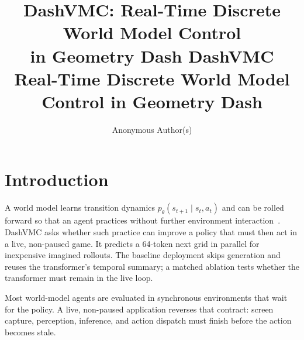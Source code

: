 \ifdashvmcsubmission
  \title{DashVMC: Real-Time Discrete World Model Control\\in Geometry Dash}
  \author{Anonymous Author(s)}
\else
  \title{%
    DashVMC\\[0.1em]
    {\large\color{black!70}Real-Time Discrete World Model Control in Geometry Dash}%
  }
  \renewcommand\authorlist{%
    \vskip 0.4cm
    {\fairtitlefont\bfseries Contributors}\\
    Florent Tariolle\textsuperscript{1},
    Florian Yger\textsuperscript{1,2}\\[0.5em]
    {\small\fairtitlefont\bfseries
      \textsuperscript{1}INSA Rouen Normandy\quad
      \textsuperscript{2}LITIS}%
  }
  \abstract{\dashvmcabstract}
\fi



\maketitle

\ifdashvmcsubmission
  \begin{abstract}
    \dashvmcabstract
  \end{abstract}
\fi

\section{Introduction}
\label{sec:intro}

A world model learns transition dynamics \(p_\theta(s_{t+1}\mid s_t,a_t)\) and can be rolled forward so that an agent practices without further environment interaction~\citep{lecun2022path,ha2018world}.
DashVMC asks whether such practice can improve a policy that must then act in a live, non-paused game.
It predicts a 64-token next grid in parallel for inexpensive imagined rollouts.
The baseline deployment skips generation and reuses the transformer's temporal summary; a matched ablation tests whether the transformer must remain in the live loop.

Most world-model agents are evaluated in synchronous environments that wait for the policy.
A live, non-paused application reverses that contract: screen capture, perception, inference, and action dispatch must finish before the action becomes stale.

